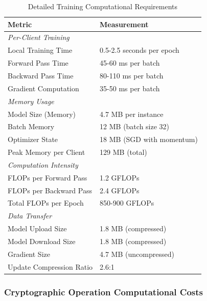 \documentclass[12pt,a4paper]{article}
\begin{document}
\begin{table}[H]
\centering
\caption{Detailed Training Computational Requirements}
\begin{tabular}{ll}
\toprule
\textbf{Metric} & \textbf{Measurement} \\
\midrule
\multicolumn{2}{l}{\textit{Per-Client Training}} \\
Local Training Time & 0.5-2.5 seconds per epoch \\
Forward Pass Time & 45-60 ms per batch \\
Backward Pass Time & 80-110 ms per batch \\
Gradient Computation & 35-50 ms per batch \\
\midrule
\multicolumn{2}{l}{\textit{Memory Usage}} \\
Model Size (Memory) & 4.7 MB per instance \\
Batch Memory & 12 MB (batch size 32) \\
Optimizer State & 18 MB (SGD with momentum) \\
Peak Memory per Client & 129 MB (total) \\
\midrule
\multicolumn{2}{l}{\textit{Computation Intensity}} \\
FLOPs per Forward Pass & 1.2 GFLOPs \\
FLOPs per Backward Pass & 2.4 GFLOPs \\
Total FLOPs per Epoch & 850-900 GFLOPs \\
\midrule
\multicolumn{2}{l}{\textit{Data Transfer}} \\
Model Upload Size & 1.8 MB (compressed) \\
Model Download Size & 1.8 MB (compressed) \\
Gradient Size & 4.7 MB (uncompressed) \\
Update Compression Ratio & 2.6:1 \\
\bottomrule
\end{tabular}
\end{table}

\subsubsection{Cryptographic Operation Computational Costs}
\end{document}
